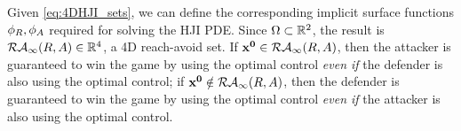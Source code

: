Given \eqref{eq:4DHJI_sets}, we can define the corresponding implicit surface functions $\phi_R,\phi_A$ required for solving the HJI PDE. Since $\Omega\subset\mathbb{R}^2$, the result is $\mathcal{RA}_\infty(R,A)\in\mathbb{R}^4$, a 4D reach-avoid set. If $\mathbf{x^0}\in\mathcal{RA}_\infty(R,A)$, then the attacker is guaranteed to win the game by using the optimal control \textit{even if} the defender is also using the optimal control; if $\mathbf{x^0}\notin\mathcal{RA}_\infty(R,A)$, then the defender is guaranteed to win the game by using the optimal control \textit{even if} the attacker is also using the optimal control.